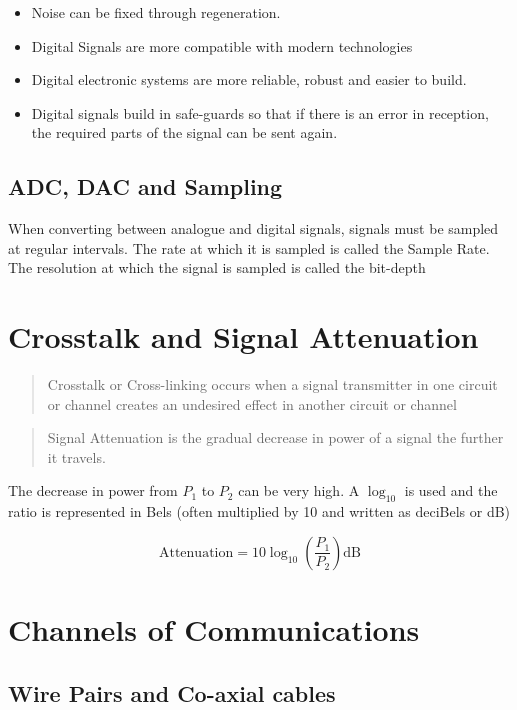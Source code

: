\documentclass{scrbook}
\begin{document}
	\begin{itemize}
		\item
			Noise can be fixed through regeneration.
		\item
			Digital Signals are more compatible with modern technologies
		\item
			Digital electronic systems are more reliable, robust and easier to build.
		\item
			Digital signals build in safe-guards so that if there is an error in reception, the required parts of the signal can be sent again.
	\end{itemize}

\subsection{ADC, DAC and Sampling}

	When converting between analogue and digital signals, signals must be sampled at regular intervals. The rate at which it is sampled is called the Sample Rate. The resolution at which the signal is sampled is called the bit-depth


\section{Crosstalk and Signal Attenuation}

	\begin{quote}
		Crosstalk or Cross-linking occurs when a signal transmitter in one circuit or channel creates an undesired effect in another circuit or channel
	\end{quote}

	\begin{quote}
		Signal Attenuation is the gradual decrease in power of a signal the further it travels.
	\end{quote}

	The decrease in power from $P_1$ to $P_2$ can be very high. A $\log_{10}$ is used and the ratio is represented in Bels (often multiplied by 10 and written as deciBels or dB)

	\[ \text{Attenuation}  = 10\log_{10}\left(\frac{P_1}{P_2}  \right) \text{dB}\]

\section{Channels of Communications}

\subsection{Wire Pairs and Co-axial cables}
\end{document}
